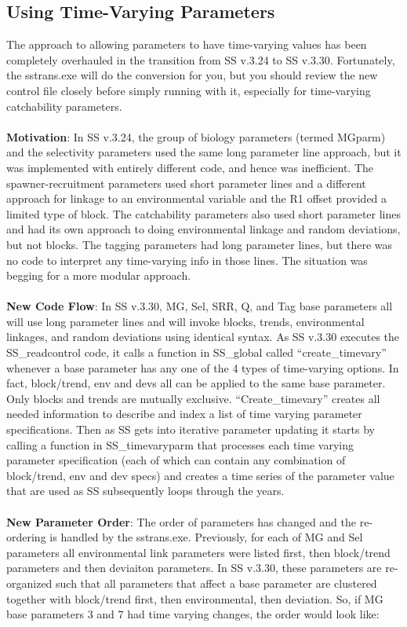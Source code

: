 \hypertarget{TVpara}{}
\subsection{Using Time-Varying Parameters}
 The approach to allowing parameters to have time-varying values has been completely overhauled in the transition from SS v.3.24 to SS v.3.30.  Fortunately, the sstrans.exe will do the conversion for you, but you should review the new control file closely before simply running with it, especially for time-varying catchability parameters.
 \\\\
 \noindent \textbf{Motivation}:  In SS v.3.24, the group of biology parameters (termed MGparm) and the selectivity parameters used the same long parameter line approach, but it was implemented with entirely different code, and hence was inefficient.  The spawner-recruitment parameters used short parameter lines and a different approach for linkage to an environmental variable and the R1 offset provided a limited type of block.  The catchability parameters also used short parameter lines and had its own approach to doing environmental linkage and random deviations, but not blocks.  The tagging parameters had long parameter lines, but there was no code to interpret any time-varying info in those lines.  The situation was begging for a more modular approach.
 \\\\
 \noindent \textbf{New Code Flow}:  In SS v.3.30, MG, Sel, SRR, Q, and Tag base parameters all will use long parameter lines and will invoke blocks, trends, environmental linkages, and random deviations using identical syntax.   As SS v.3.30 executes the SS\_readcontrol code, it calls a function in SS\_global called “create\_timevary” whenever a base parameter has any one of the 4 types of time-varying options.  In fact, block/trend, env and devs all can be applied to the same base parameter.  Only blocks and trends are mutually exclusive.  “Create\_timevary” creates all needed information to describe and index a list of time varying parameter specifications.  Then as SS gets into iterative parameter updating it starts by calling a function in SS\_timevaryparm that processes each time varying parameter specification (each of which can contain any combination of block/trend, env and dev specs) and creates a time series of the parameter value that are used as SS subsequently loops through the years.
 \\\\
 \noindent \textbf{New Parameter Order}: The order of parameters has changed and the re-ordering is handled by the sstrans.exe.  Previously, for each of MG and Sel parameters all environmental link parameters were listed first, then block/trend parameters and then deviaiton parameters.  In SS v.3.30, these parameters are re-organized such that all parameters that affect a base parameter are clustered together with block/trend first, then environmental, then deviation.  So, if MG base parameters 3 and 7 had time varying changes, the order would look like:
 
